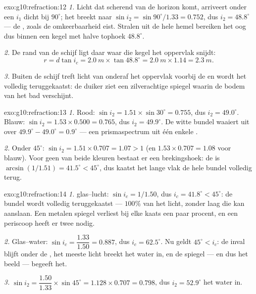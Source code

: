 \begin{solution}{exo:g10:refraction:12}
\emph{1.} Licht dat scherend van de horizon komt, arriveert onder een
$i_1$ dicht bij $90^\circ$; het breekt naar
$\sin i_2 = \sin 90^\circ / 1.33 = 0.752$, dus $i_2 = 48.8^\circ$ --- de
, zoals de omkeerbaarheid eist. Stralen uit de hele hemel
bereiken het oog dus binnen een kegel met halve tophoek $48.8^\circ$.

\emph{2.} De rand van de schijf ligt daar waar die kegel het oppervlak
snijdt:
\[
r = d \tan i_c = \qty{2.0}{m} \times \tan 48.8^\circ
= \qty{2.0}{m} \times 1.14 = \qty{2.3}{m}.
\]

\emph{3.} Buiten de schijf treft licht van onderaf het oppervlak voorbij
de  en wordt het volledig teruggekaatst: de duiker ziet een
zilverachtige spiegel waarin de bodem van het bad verschijnt.
\end{solution}

\begin{solution}{exo:g10:refraction:13}
\emph{1.} Rood: $\sin i_2 = 1.51 \times \sin 30^\circ = 0.755$, dus
$i_2 = 49.0^\circ$. Blauw: $\sin i_2 = 1.53 \times 0.500 = 0.765$, dus
$i_2 = 49.9^\circ$. De witte bundel waaiert uit over
$49.9^\circ - 49.0^\circ = 0.9^\circ$ --- een prismaspectrum uit één
enkele .

\emph{2.} Onder $45^\circ$: $\sin i_2 = 1.51 \times 0.707 = 1.07 > 1$
(en $1.53 \times 0.707 = 1.08$ voor blauw). Voor geen van beide kleuren
bestaat er een brekingshoek: de  is
$\arcsin(1/1.51) = 41.5^\circ < 45^\circ$, dus kaatst het lange vlak de
hele bundel volledig terug.
\end{solution}

\begin{solution}{exo:g10:refraction:14}
\emph{1.}  glas--lucht: $\sin i_c = 1/1.50$, dus
$i_c = 41.8^\circ < 45^\circ$: de bundel wordt volledig teruggekaatst ---
$100\%$ van het licht, zonder laag die kan aanslaan. Een metalen spiegel
verliest bij elke kaats een paar procent, en een periscoop heeft er twee
nodig.

\emph{2.} Glas--water: $\sin i_c = \dfrac{1.33}{1.50} = 0.887$, dus
$i_c = 62.5^\circ$. Nu geldt $45^\circ < i_c$: de inval blijft onder de
, het meeste licht breekt het water in, en de spiegel --- en dus
het beeld --- begeeft het.

\emph{3.} $\sin i_2 = \dfrac{1.50}{1.33} \times \sin 45^\circ
= 1.128 \times 0.707 = 0.798$, dus $i_2 = 52.9^\circ$ het water in.
\end{solution}

